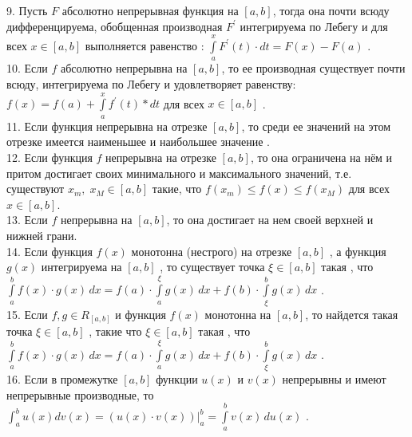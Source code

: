 \documentclass[12pt]{article}
\begin{document}
9. Пусть ${\displaystyle F}$ абсолютно непрерывная функция на ${\displaystyle [a,b]}$, тогда она почти всюду дифференцируема, обобщенная производная ${\displaystyle F^{\prime}}$ интегрируема по Лебегу и для всех ${\displaystyle x \in [a,b]}$ выполняется равенство : ${\displaystyle \int \limits _{a}^{x} F^{\prime}(t)\cdot dt=F(x)-F(a)}$ .\\

10. Если  ${\displaystyle f}$ абсолютно непрерывна на ${\displaystyle [a,b]}$, то ее производная существует почти всюду, интегрируема по Лебегу и удовлетворяет равенству: ${\displaystyle f(x)=f(a)+\int \limits _{a}^{x} f^{\prime}(t)*dt}$ для всех ${\displaystyle x \in [a,b]}$ .\\

11. Если функция непрерывна на отрезке  ${\displaystyle [a,b]}$, то среди ее значений на этом отрезке имеется наименьшее и наибольшее значение .\\

12. Если функция ${\displaystyle f}$ непрерывна на отрезке ${\displaystyle [a,b]}$, то она ограничена на нём и притом достигает своих минимального и максимального значений, т.е. существуют ${\displaystyle x_{m},\;x_{M}\in [a,b]}$ такие, что ${\displaystyle f(x_{m})\leq f(x)\leq f(x_{M})}$ для всех ${\displaystyle x\in [a,b]}$.\\

13. Если ${\displaystyle f}$ непрерывна на ${\displaystyle [a,b]}$, то она достигает на нем своей верхней и нижней грани.\\

14. Если функция ${\displaystyle f(x)}$ монотонна (нестрого) на отрезке ${\displaystyle [a,b]}$ , а функция ${\displaystyle g(x)}$ интегрируема на ${\displaystyle [a,b]}$ , то существует точка  ${\displaystyle \xi \in [a,b]}$ такая , что ${\displaystyle \int \limits _{a}^{b} f(x)\cdot g(x)\,dx=f(a)\cdot \int \limits _{a}^{\xi} g(x)\,dx+f(b)\cdot \int \limits _{\xi}^{b} g(x)\,dx }$ .\\

15. Если ${\displaystyle f,g \in R_{[a,b]}}$ и функция ${\displaystyle f(x)}$ монотонна на ${\displaystyle [a,b]}$, то найдется такая точка ${\displaystyle \xi \in [a,b]}$ , такие что ${\displaystyle \xi \in [a,b]}$ такая , что ${\displaystyle \int \limits _{a}^{b} f(x)\cdot g(x)\,dx=f(a)\cdot \int \limits _{a}^{\xi} g(x)\,dx+f(b)\cdot \int \limits _{\xi}^{b} g(x)\,dx }$ .\\

16. Если в промежутке  ${\displaystyle [a,b]}$ функции ${\displaystyle u(x)}$ и  ${\displaystyle v(x)}$ непрерывны и имеют непрерывные производные, то ${\displaystyle \int _{a}^{b} u(x)dv(x)=(u(x)\cdot v(x)){\vert}^{b}_{a}=\int \limits _{a}^{b} v(x)\,du(x)}$ .\\
\end{document}
